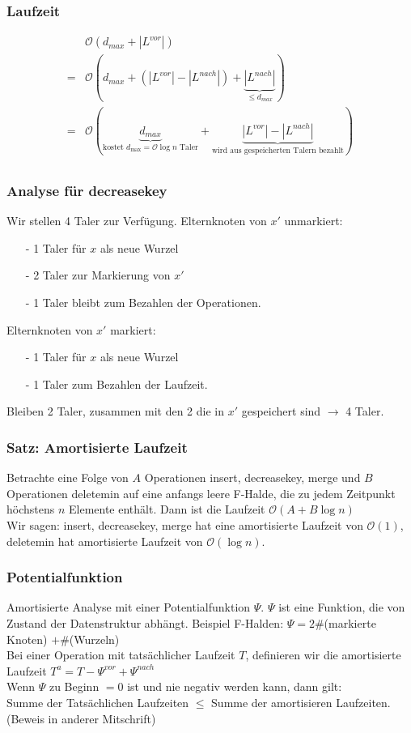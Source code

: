 \subsubsection{Laufzeit}
\begin{align*}
& \mathcal{O}(d_{max} + |L^{vor}|)\\
=& \mathcal{O}(d_{max} + (|L^{vor}|-|L^{nach}|) + \underbrace{|L^{nach}|}_{\leq d_{max}})\\
=& \mathcal{O}( \underbrace{ d_{max} }_{\text{kostet } d_\max = \mathcal{O}{\log n} \text{ Taler}} + \underbrace{ |L^{vor}| - |L^{nach}| }_{\text{wird aus gespeicherten Talern bezahlt}})\\
\end{align*}

\subsubsection{Analyse für decreasekey}
Wir stellen 4 Taler zur Verfügung.
Elternknoten von $x'$ unmarkiert:
\begin{enumerate}
\item[-] 1 Taler für $x$ als neue Wurzel
\item[-] 2 Taler zur Markierung von $x'$
\item[-] 1 Taler bleibt zum Bezahlen der Operationen.
\end{enumerate}
Elternknoten von $x'$ markiert:
\begin{enumerate}
\item[-] 1 Taler für $x$ als neue Wurzel
\item[-] 1 Taler zum Bezahlen der Laufzeit.
\end{enumerate}
Bleiben 2 Taler, zusammen mit den 2 die in $x'$ gespeichert sind $\rightarrow$ 4 Taler.\\
\subsubsection{Satz: Amortisierte Laufzeit}
Betrachte eine Folge von $A$ Operationen insert, decreasekey, merge und $B$ Operationen deletemin auf eine anfangs leere F-Halde, die zu jedem Zeitpunkt höchstens $n$ Elemente enthält. Dann ist die Laufzeit $\mathcal{O}(A + B \log n)$\\
Wir sagen: insert, decreasekey, merge hat eine amortisierte Laufzeit von $\mathcal{O}(1)$, deletemin hat amortisierte Laufzeit von $\mathcal{O}(\log n)$.\\
\subsubsection{Potentialfunktion}
Amortisierte Analyse mit einer Potentialfunktion $\Psi$. $\Psi$ ist eine Funktion, die von Zustand der Datenstruktur abhängt. Beispiel F-Halden: $\Psi = 2 \#$(markierte Knoten) $+ \#$(Wurzeln)\\
Bei einer Operation mit tatsächlicher Laufzeit $T$, definieren wir die amortisierte Laufzeit $T^a = T - \Psi^{vor} + \Psi^{nach}$\\
Wenn $\Psi$ zu Beginn $=0$ ist und nie negativ werden kann, dann gilt:\\
Summe der Tatsächlichen Laufzeiten $\leq $ Summe der amortisieren Laufzeiten.\\
(Beweis in anderer Mitschrift)